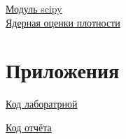 \documentclass[a4]{article}
\begin{document}
	\href{https://www.scipy.org/}{Модуль scipy}\\
	
	\href{https://ru.wikipedia.org/wiki/%D0%AF%D0%B4%D0%B5%D1%80%D0%BD%D0%B0%D1%8F_%D0%BE%D1%86%D0%B5%D0%BD%D0%BA%D0%B0_%D0%BF%D0%BB%D0%BE%D1%82%D0%BD%D0%BE%D1%81%D1%82%D0%B8}{Ядерная оценки плотности}\\
	
	\section{Приложения}
	
	\href{https://github.com/LuciusGen/Matstat/blob/master/Lab4/Lab4.py}{Код лаборатрной}
	
	\href{https://github.com/LuciusGen/Matstat/blob/master/Lab4/lab4.tex}{Код отчёта}
	
\end{document}
